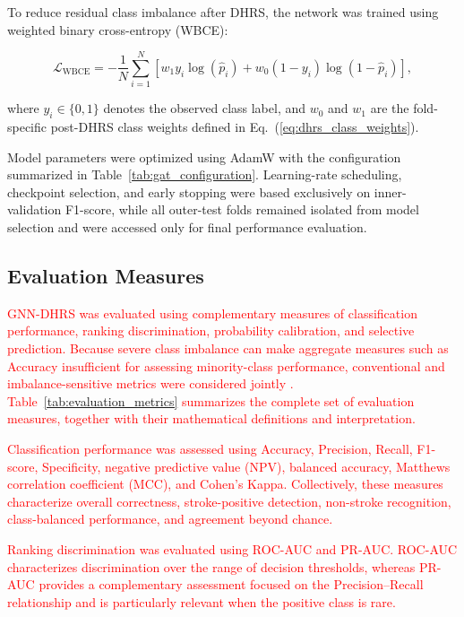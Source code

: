 \documentclass[pdflatex,sn-mathphys-num]{sn-jnl}%
\theoremstyle{thmstyleone}%
\theoremstyle{thmstyletwo}%
\theoremstyle{thmstylethree}%
\begin{document}
To reduce residual class imbalance after DHRS, the network was trained using
weighted binary cross-entropy (WBCE):

\begin{equation}
\mathcal{L}_{\mathrm{WBCE}}
=
-\frac{1}{N}
\sum_{i=1}^{N}
\left[
w_1y_i\log(\widehat{p}_i)
+
w_0(1-y_i)\log(1-\widehat{p}_i)
\right],
\label{eq:weighted_bce}
\end{equation}

where \(y_i\in\{0,1\}\) denotes the observed class label, and \(w_0\) and
\(w_1\) are the fold-specific post-DHRS class weights defined in
Eq.~(\ref{eq:dhrs_class_weights}).

 {
Model parameters were optimized using AdamW with the configuration summarized
in Table~\ref{tab:gat_configuration}. Learning-rate scheduling, checkpoint
selection, and early stopping were based exclusively on inner-validation
F1-score, while all outer-test folds remained isolated from model selection
and were accessed only for final performance evaluation.
}
\subsection{Evaluation Measures}
\label{subsec:evaluation_measures}

\textcolor{red}{
GNN-DHRS was evaluated using complementary measures of classification
performance, ranking discrimination, probability calibration, and selective
prediction. Because severe class imbalance can make aggregate measures such as
Accuracy insufficient for assessing minority-class performance, conventional
and imbalance-sensitive metrics were considered jointly
\cite{he2009learning,haixiang2017learning}.
Table~\ref{tab:evaluation_metrics} summarizes the complete set of evaluation
measures, together with their mathematical definitions and interpretation.
}

\textcolor{red}{
Classification performance was assessed using Accuracy, Precision, Recall,
F1-score, Specificity, negative predictive value (NPV), balanced accuracy,
Matthews correlation coefficient (MCC), and Cohen's Kappa. Collectively, these
measures characterize overall correctness, stroke-positive detection,
non-stroke recognition, class-balanced performance, and agreement beyond
chance.
}

\textcolor{red}{
Ranking discrimination was evaluated using ROC-AUC and PR-AUC. ROC-AUC
characterizes discrimination over the range of decision thresholds, whereas
PR-AUC provides a complementary assessment focused on the Precision--Recall
relationship and is particularly relevant when the positive class is rare.
}
\end{document}
